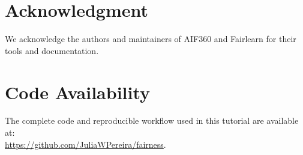 \section*{Acknowledgment}
We acknowledge the authors and maintainers of AIF360 and Fairlearn for their tools and documentation.

\section*{Code Availability}

The complete code and reproducible workflow used in this tutorial are available at: \\  
\url{https://github.com/JuliaWPereira/fairness}.
